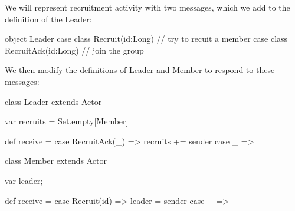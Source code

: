 \documentclass{article}
\begin{document}
We will represent recruitment activity with two messages, which we add to the definition of the Leader:

\begin{code}[title=Covert Leader Helper Object]
object Leader {
  case class Recruit(id:Long) // try to recuit a member
  case class RecruitAck(id:Long) // join the group
}
\end{code}

We then modify the definitions of Leader and Member to respond to these messages:

\begin{code}[title=Using Messages]
class Leader extends Actor {
  var recruits = Set.empty[Member]
  
  def receive = {
    case RecruitAck(_) =>
      recruits += sender
    case _ =>
  }
}

class Member extends Actor {
  var leader;

  def receive = {
    case Recruit(id) =>
      leader = sender
    case _ =>
  }
  
}
\end{code}
%       
%    
% 
\end{document}
